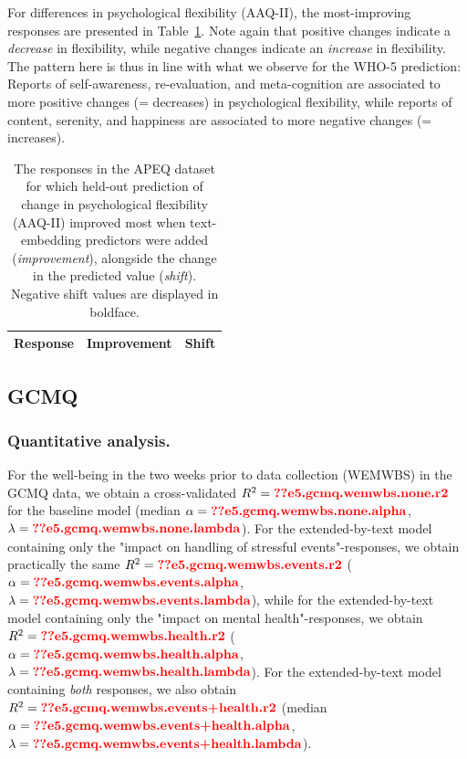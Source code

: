 \documentclass[man,floatsintext]{apa7}
\newcommand{\change}[1]{#1}
\begin{document}
For differences in psychological flexibility (AAQ-II), the most-improving responses are presented in Table~\ref{tab:examples_APEQ_AAQ}. \change{Note again that positive changes indicate a \emph{decrease} in flexibility, while negative changes indicate an \emph{increase} in flexibility.} The pattern here \change{is thus in line with what we observe for} the WHO-5 prediction: Reports of self-awareness, re-evaluation, and meta-cognition are associated to more positive changes \change{(= decreases)} in psychological flexibility, while reports of content, serenity, and happiness are associated to more negative changes \change{(= increases)}. 

\begin{table}[!htbp]
\centering
\caption{The  responses in the APEQ dataset for which \change{held-out} prediction of change in psychological flexibility (AAQ-II) improved most when text-embedding predictors were added (\emph{improvement}), alongside the change in the predicted value (\emph{shift}). Negative shift values are displayed in boldface. }
\label{tab:examples_APEQ_AAQ}
\begingroup\scriptsize
\begin{tabular}{p{12cm}rr}
  \hline
Response & Improvement & Shift \\
  \hline

   \end{tabular}
\endgroup
\end{table}


\subsection{GCMQ}

\subsubsection{Quantitative analysis.} {For the well-being in the two weeks prior to data collection (WEMWBS) in the GCMQ data, we obtain a cross-validated $R^2 = \res{e5.gcmq.wemwbs.none.r2}$ for the baseline model (\change{median} $\alpha = \res{e5.gcmq.wemwbs.none.alpha}$, $\lambda = \res{e5.gcmq.wemwbs.none.lambda}$). For the extended-by-text model containing  only the "impact on handling of stressful events"-responses, we obtain \change{practically the same} $R^2 =\res{e5.gcmq.wemwbs.events.r2}$  ($\alpha = \res{e5.gcmq.wemwbs.events.alpha}$, $\lambda = \res{e5.gcmq.wemwbs.events.lambda}$), while for the extended-by-text model containing only the "impact on mental health"-responses, we obtain $R^2 = \res{e5.gcmq.wemwbs.health.r2}$  ($\alpha = \res{e5.gcmq.wemwbs.health.alpha}$, $\lambda = \res{e5.gcmq.wemwbs.health.lambda}$). \change{For} the extended-by-text model containing \emph{both} responses, we also obtain $R^2 = \res{e5.gcmq.wemwbs.events+health.r2}$ (\change{median} $\alpha = \res{e5.gcmq.wemwbs.events+health.alpha}$, $\lambda = \res{e5.gcmq.wemwbs.events+health.lambda}$).}
\end{document}

